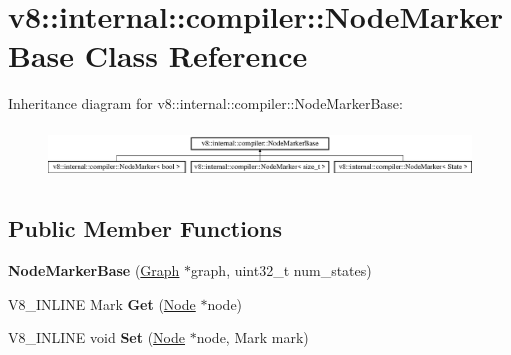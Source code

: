 \hypertarget{classv8_1_1internal_1_1compiler_1_1_node_marker_base}{}\section{v8\+:\+:internal\+:\+:compiler\+:\+:Node\+Marker\+Base Class Reference}
\label{classv8_1_1internal_1_1compiler_1_1_node_marker_base}
Inheritance diagram for v8\+:\+:internal\+:\+:compiler\+:\+:Node\+Marker\+Base\+:\begin{figure}[H]
\begin{center}
\leavevmode
\includegraphics[height=1.387856cm]{classv8_1_1internal_1_1compiler_1_1_node_marker_base}
\end{center}
\end{figure}
\subsection*{Public Member Functions}
\begin{DoxyCompactItemize}
\item 
{\bfseries Node\+Marker\+Base} (\hyperlink{classv8_1_1internal_1_1compiler_1_1_graph}{Graph} $\ast$graph, uint32\+\_\+t num\+\_\+states)\hypertarget{classv8_1_1internal_1_1compiler_1_1_node_marker_base_ab86873db434c193862e8f0ffb34ab048}{}\label{classv8_1_1internal_1_1compiler_1_1_node_marker_base_ab86873db434c193862e8f0ffb34ab048}

\item 
V8\+\_\+\+I\+N\+L\+I\+NE Mark {\bfseries Get} (\hyperlink{classv8_1_1internal_1_1compiler_1_1_node}{Node} $\ast$node)\hypertarget{classv8_1_1internal_1_1compiler_1_1_node_marker_base_aea1bcb95c9d91afc645ffdc0d1a1cceb}{}\label{classv8_1_1internal_1_1compiler_1_1_node_marker_base_aea1bcb95c9d91afc645ffdc0d1a1cceb}

\item 
V8\+\_\+\+I\+N\+L\+I\+NE void {\bfseries Set} (\hyperlink{classv8_1_1internal_1_1compiler_1_1_node}{Node} $\ast$node, Mark mark)\hypertarget{classv8_1_1internal_1_1compiler_1_1_node_marker_base_ad02e40edc769e208f8cc432c74a7d0d9}{}\label{classv8_1_1internal_1_1compiler_1_1_node_marker_base_ad02e40edc769e208f8cc432c74a7d0d9}

\end{DoxyCompactItemize}
